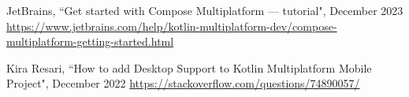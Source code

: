 
\begin{thebibliography}{100}

 JetBrains, ``Get started with Compose Multiplatform — tutorial", December 2023
\href{https://www.jetbrains.com/help/kotlin-multiplatform-dev/compose-multiplatform-getting-started.html}{https://www.jetbrains.com/help/kotlin-multiplatform-dev/compose-multiplatform-getting-started.html}

  Kira Resari, ``How to add Desktop Support to Kotlin Multiplatform Mobile Project", December 2022
\href{https://stackoverflow.com/questions/74890057/}{https://stackoverflow.com/questions/74890057/}

\end{thebibliography}
